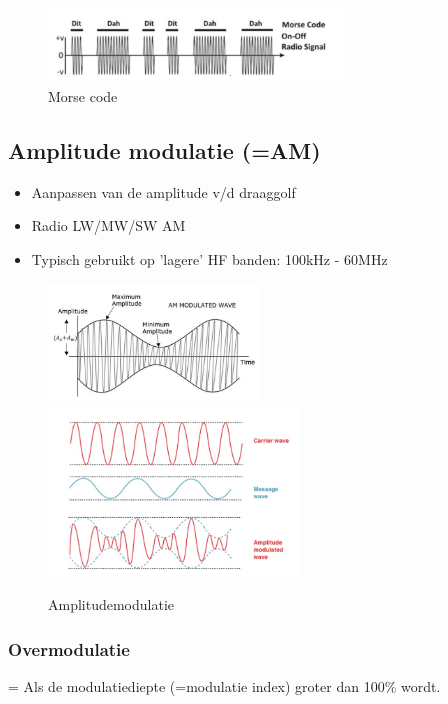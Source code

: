 \documentclass{article}
\begin{document}
\begin{figure}[H]
    \centering
    \includegraphics[width=0.7\textwidth]{Screenshot_20200302_120000.png}
    \caption{Morse code}
\end{figure}

\subsection{Amplitude modulatie (=AM)}
\begin{itemize}
    \item Aanpassen van de amplitude v/d draaggolf
    \item Radio LW/MW/SW AM
    \item Typisch gebruikt op 'lagere' HF banden: 100kHz - 60MHz
\end{itemize}

\begin{figure}[H]
    \centering
    \includegraphics[width=0.5\textwidth]{Screenshot_20200302_120121.png}
    \includegraphics[width=0.6\textwidth]{Screenshot_20200302_120147.png}
    \caption{Amplitudemodulatie}
\end{figure}
    

\subsubsection{Overmodulatie}
= Als de modulatiediepte (=modulatie index) groter dan 100\% wordt.
\end{document}
